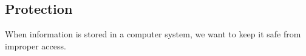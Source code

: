 \subsection{Protection}\label{subsec:File_Protection}
When information is stored in a computer system, we want to keep it safe from improper access.


